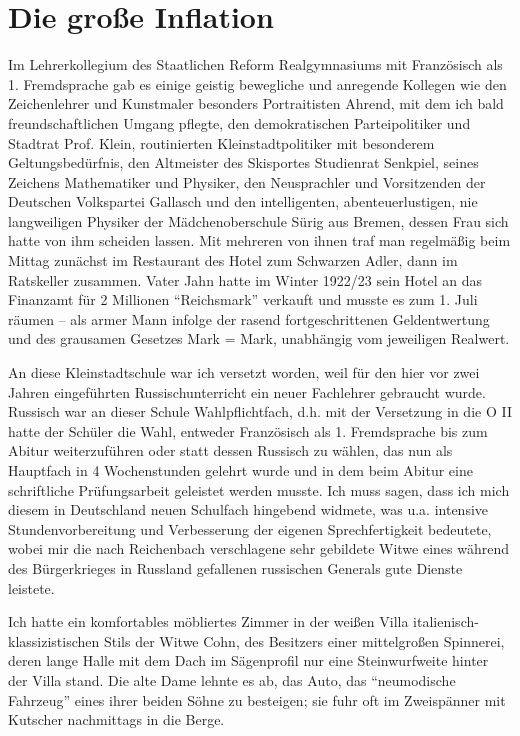 \documentclass[a5paper,pagesize,10pt,twoside=true]{scrbook}
\begin{document}
\section{Die große Inflation}
Im Lehrerkollegium des Staatlichen Reform Realgymnasiums mit Französisch als 1. Fremdsprache gab es einige geistig bewegliche und anregende Kollegen wie den Zeichenlehrer und Kunstmaler besonders Portraitisten Ahrend, mit dem ich bald freundschaftlichen Umgang pflegte, den demokratischen Parteipolitiker und Stadtrat Prof. Klein, routinierten Kleinstadtpolitiker mit besonderem Geltungsbedürfnis, den Altmeister des Skisportes Studienrat Senkpiel, seines Zeichens Mathematiker und Physiker, den Neusprachler und Vorsitzenden der Deutschen Volkspartei Gallasch und den intelligenten, abenteuerlustigen, nie langweiligen Physiker der Mädchenoberschule Sürig aus Bremen, dessen Frau sich hatte von ihm scheiden lassen. Mit mehreren von ihnen traf man regelmäßig beim Mittag zunächst im Restaurant des Hotel zum Schwarzen Adler, dann im Ratskeller zusammen. Vater Jahn hatte im Winter 1922/23 sein Hotel an das Finanzamt für 2 Millionen \enquote{Reichsmark} verkauft und musste es zum 1. Juli räumen -- als armer Mann infolge der rasend fortgeschrittenen Geldentwertung und des grausamen Gesetzes Mark = Mark, unabhängig vom jeweiligen Realwert.

An diese Kleinstadtschule war ich versetzt worden, weil für den hier vor zwei Jahren eingeführten Russischunterricht ein neuer Fachlehrer gebraucht wurde. Russisch war an dieser Schule Wahlpflichtfach, d.h. mit der Versetzung in die O II hatte der Schüler die Wahl, entweder Französisch als 1. Fremdsprache bis zum Abitur weiterzuführen oder statt dessen Russisch zu wählen, das nun als Hauptfach in 4 Wochenstunden gelehrt wurde und in dem beim Abitur eine schriftliche Prüfungsarbeit geleistet werden musste. Ich muss sagen, dass ich mich diesem in Deutschland neuen Schulfach hingebend widmete, was u.a. intensive Stundenvorbereitung und Verbesserung der eigenen Sprechfertigkeit bedeutete, wobei mir die nach Reichenbach verschlagene sehr gebildete Witwe eines während des Bürgerkrieges in Russland gefallenen russischen Generals gute Dienste leistete.

Ich hatte ein komfortables möbliertes Zimmer in der weißen Villa italienisch-klassizistischen Stils der Witwe Cohn, des Besitzers einer mittelgroßen Spinnerei, deren lange Halle mit dem Dach im Sägenprofil nur eine Steinwurfweite hinter der Villa stand. Die alte Dame lehnte es ab, das Auto, das \enquote{neumodische Fahrzeug} eines ihrer beiden Söhne zu besteigen; sie fuhr oft im Zweispänner mit Kutscher nachmittags in die Berge.
\end{document}
